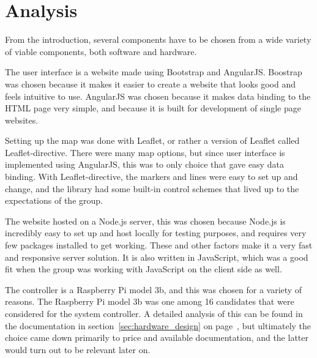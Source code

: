 \chapter{Analysis}

From the introduction, several components have to be chosen from a wide variety of viable components, both software and hardware.

The user interface is a website made using Bootstrap\cite{bootstrap} and AngularJS\cite{angular}. 
Boostrap was chosen because it makes it easier to create a website that looks good and feels intuitive to use.
AngularJS was chosen because it makes data binding to the HTML page very simple, and because it is built for development of single page websites.

Setting up the map was done with Leaflet, or rather a version of Leaflet called Leaflet-directive\cite{leaflet}. There were many map options, but since user interface is implemented using AngularJS, this was to only choice that gave easy data binding. With Leaflet-directive, the markers and lines were easy to set up and change, and the library had some built-in control schemes that lived up to the expectations of the group.

The website hosted on a Node.js server\cite{nodejs}, this was chosen because Node.js is incredibly easy to set up and host locally for testing purposes, and requires very few packages installed to get working. These and other factors make it a very fast and responsive server solution. It is also written in JavaScript, which was a good fit when the group was working with JavaScript on the client side as well.

The controller is a Raspberry Pi model 3b, and this was chosen for a variety of reasons. The Raspberry Pi model 3b was one among 16 candidates that were considered for the system controller. A detailed analysis of this can be found in the documentation in section~\ref{sec:hardware_design} on page~\pageref{sec:hardware_design}, but ultimately the choice came down primarily to price and available documentation, and the latter would turn out to be relevant later on.

